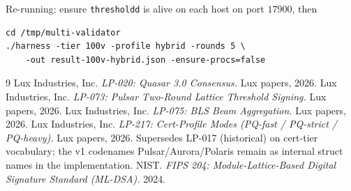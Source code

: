 \documentclass[11pt,a4paper]{article}
\begin{document}
Re-running: ensure \texttt{thresholdd} is alive on each host on
port $17900$, then

\begin{verbatim}
cd /tmp/multi-validator
./harness -tier 100v -profile hybrid -rounds 5 \
    -out result-100v-hybrid.json -ensure-procs=false
\end{verbatim}

\begin{thebibliography}{9}
Lux Industries, Inc. \emph{LP-020: Quasar 3.0 Consensus.}
Lux papers, 2026.
Lux Industries, Inc. \emph{LP-073: Pulsar Two-Round Lattice
Threshold Signing.} Lux papers, 2026.
Lux Industries, Inc. \emph{LP-075: BLS Beam Aggregation.} Lux
papers, 2026.
Lux Industries, Inc. \emph{LP-217: Cert-Profile Modes
(PQ-fast / PQ-strict / PQ-heavy).} Lux papers, 2026.
Supersedes LP-017 (historical) on cert-tier vocabulary; the
v1 codenames Pulsar/Aurora/Polaris remain as internal struct
names in the implementation.
NIST. \emph{FIPS 204: Module-Lattice-Based Digital Signature
Standard (ML-DSA).} 2024.
\end{thebibliography}
\end{document}
